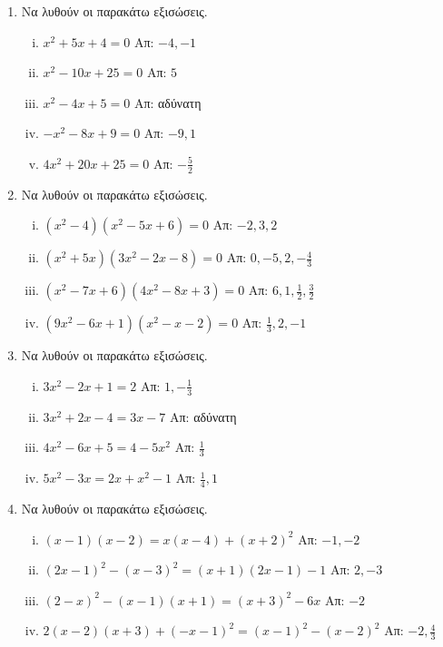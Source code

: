 \begin{enumerate}
  \item  Να λυθούν οι παρακάτω εξισώσεις.
    \begin{enumerate}[i)]
      \item $ x^{2} + 5x + 4 = 0 $ \hfill Απ:  $ -4, -1 $
      \item $ x^{2} - 10x + 25 = 0 $ \hfill Απ: $ 5 $
      \item $ x^{2} - 4x + 5 = 0 $ \hfill Απ:  αδύνατη
      \item $ -x^{2} - 8x + 9 = 0 $ \hfill Απ: $ -9, 1 $
      \item $ 4x^{2} + 20x + 25 = 0 $ \hfill Απ: $ - \frac{5}{2} $ 
    \end{enumerate}

  \item Να λυθούν οι παρακάτω εξισώσεις.
    \begin{enumerate}[i)]
      \item $ (x^{2} - 4)(x^{2} - 5x + 6) = 0 $ \hfill Απ: $ -2, 3, 2 $ 
      \item $ (x^{2} + 5x)(3x^{2} - 2x - 8) = 0 $ \hfill Απ: $ 0, -5, 2, -\frac{4}{3} $
      \item $ (x^{2} - 7x + 6)(4x^{2}- 8x + 3) = 0 $ \hfill Απ: $ 6, 1, \frac{1}{2},
        \frac{3}{2} $
      \item $ (9x^{2} - 6x + 1)(x^{2} - x - 2) = 0 $ \hfill Απ: $ \frac{1}{3}, 2, -1  $ 
    \end{enumerate}

  \item Να λυθούν οι παρακάτω εξισώσεις.
    \begin{enumerate}[i)]
      \item $ 3x^{2} - 2x + 1 = 2 $ \hfill Απ: $ 1, - \frac{1}{3} $  
      \item $ 3x^{2} + 2x - 4 = 3x - 7 $ \hfill Απ:  αδύνατη
      \item $ 4x^{2} - 6x + 5 = 4 - 5x^{2} $ \hfill Απ: $ \frac{1}{3} $
      \item $ 5x^{2} - 3x = 2x + x^{2} - 1 $ \hfill Απ: $ \frac{1}{4}, 1 $ 
    \end{enumerate}

  \item Να λυθούν οι παρακάτω εξισώσεις.
    \begin{enumerate}[i)]
      \item $ (x-1)(x-2) = x(x-4)+(x+2)^{2} $ \hfill Απ: $ -1, -2 $
      \item $ (2x-1)^{2} - (x-3)^{2} = (x+1)(2x-1) - 1 $ \hfill Απ: $ 2, -3 $
      \item $ (2-x)^{2} - (x-1)(x+1) = (x+3)^{2} - 6x $ \hfill Απ: $ -2 $
      \item $ 2(x-2)(x+3) + (-x-1)^{2} = (x-1)^{2} - (x-2)^{2} $ \hfill Απ: $ -2,
        \frac{4}{3} $ 
    \end{enumerate}


\end{enumerate}

